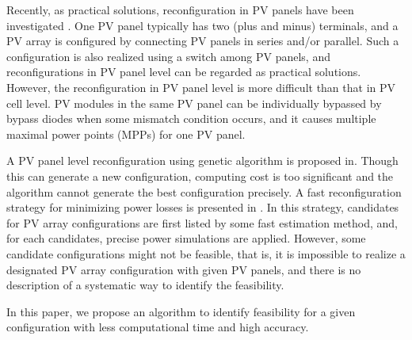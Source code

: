 \documentclass[conference]{IEEEtran}
\begin{document}
Recently, as practical solutions, reconfiguration in PV panels have been investigated \cite{b5}\cite{b10}. One PV panel typically has two (plus and minus) terminals, and a PV array is configured by connecting PV panels in series and/or parallel. Such a configuration is also realized using a switch among PV panels, and reconfigurations in PV panel level can be regarded as  practical solutions. However, the reconfiguration in PV panel level is more difficult than that in PV cell level. PV modules in the same PV panel can be individually bypassed by bypass diodes when some mismatch condition occurs, and it causes multiple maximal power points (MPPs) for one PV panel.  

A PV panel level reconfiguration using genetic algorithm is proposed in\cite{b5}. Though this can generate a new configuration, 
computing cost is too significant and the algorithm cannot generate the best configuration precisely. A fast reconfiguration
strategy for minimizing power losses is presented in \cite{b10}.
In this strategy, candidates for PV array configurations are first listed by some fast estimation method, and, for each candidates, precise power simulations are applied. However, some candidate configurations might not be feasible, that is, it is impossible to realize a designated PV array configuration with given PV panels, and there is no description of a systematic way to identify the feasibility. 

In this paper,  we propose an algorithm to identify feasibility for a given configuration with less computational time and high
accuracy.
%
\end{document}
